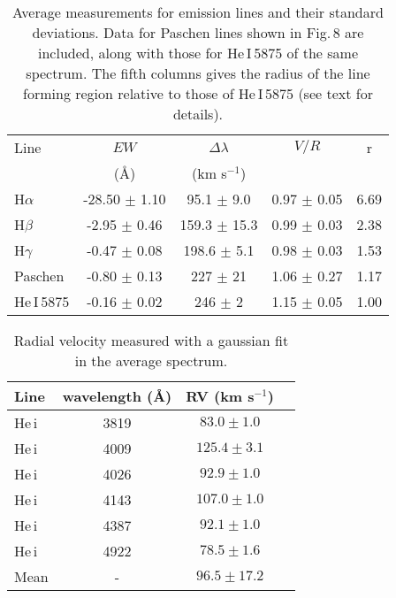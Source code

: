 \documentclass[useAMS,usenatbib]{mn2e}
\begin{document}
\begin{table}
\centering
 \caption{Average measurements for emission lines and their standard deviations.
 Data for Paschen lines shown in Fig.\,8 are included, along with those for He\,I\,5875 of the same spectrum. The fifth columns gives
 the radius of the line forming region relative to those of He\,I\,5875 (see text for details). }
 \begin{tabular}{@{}lcccc@{}}
 \hline
Line &$EW$ &$\Delta \lambda$  &$V/R$& r \\
 & (\AA) & (km s$^{-1}$) & &\\
\hline
H$\alpha$ &-28.50 $\pm$ 1.10 & 95.1 $\pm$ 9.0 & 0.97 $\pm$ 0.05 &6.69\\
H$\beta$& -2.95 $\pm$ 0.46 & 159.3 $\pm$ 15.3 & 0.99 $\pm$ 0.03 &2.38\\
H$\gamma$ & -0.47 $\pm$ 0.08 &198.6 $\pm$ 5.1   & 0.98 $\pm$ 0.03&1.53 \\
Paschen &-0.80 $\pm$ 0.13 &227 $\pm$ 21 &  1.06 $\pm$ 0.27&1.17\\
He\,I\,5875 &-0.16 $\pm$ 0.02 & 246 $\pm$ 2 &1.15 $\pm$ 0.05 &1.00\\
\hline
\end{tabular}
\end{table}


\begin{table}
\centering
 \caption{  Radial velocity measured with a gaussian fit in the average spectrum.}
 \begin{tabular}{@{}lccc@{}}
 \hline
Line & wavelength (\AA) &RV (km s$^{-1}$) \\
\hline
He\,{\sc i} & 3819 & $83.0\pm1.0$\\
He\,{\sc i} & 4009 & $125.4\pm3.1$\\
He\,{\sc i} & 4026  & $92.9\pm1.0$\\
He\,{\sc i} & 4143 & $107.0\pm1.0$\\
He\,{\sc i} & 4387 &$92.1\pm1.0$ \\
He\,{\sc i} & 4922 &$78.5\pm 1.6$ \\ \hline
Mean  & - &$96.5\pm 17.2$\\
 \hline
\end{tabular}
\end{table}
\end{document}
